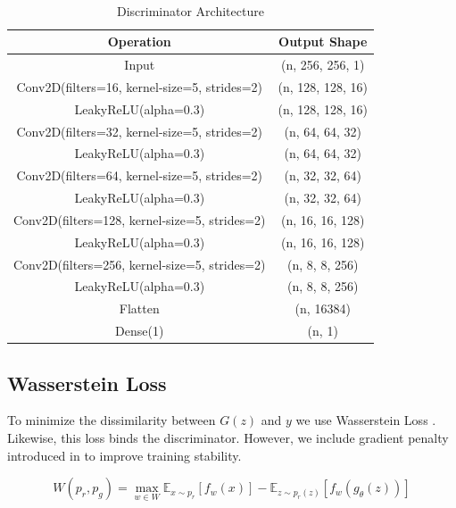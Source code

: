 \begin{center}
    \begin{table}[H]
        \centering
        \caption{\\Discriminator Architecture}
        \begin{tabular}{c|c}
             Operation & Output Shape \\
             \hline
             Input & (n, 256, 256, 1)\\
             Conv2D(filters=16, kernel-size=5, strides=2) & (n, 128, 128, 16)\\
             LeakyReLU(alpha=0.3)         & (n, 128, 128, 16)\\
             Conv2D(filters=32, kernel-size=5, strides=2) & (n, 64, 64, 32)\\
             LeakyReLU(alpha=0.3)         & (n, 64, 64, 32)\\
             Conv2D(filters=64, kernel-size=5, strides=2) & (n, 32, 32, 64)\\
             LeakyReLU(alpha=0.3)         & (n, 32, 32, 64)\\
             Conv2D(filters=128, kernel-size=5, strides=2) & (n, 16, 16, 128)\\
             LeakyReLU(alpha=0.3)         & (n, 16, 16, 128)\\
             Conv2D(filters=256, kernel-size=5, strides=2) & (n, 8, 8, 256)\\
             LeakyReLU(alpha=0.3)         & (n, 8, 8, 256)\\
             Flatten           & (n, 16384)\\
             Dense(1)             & (n, 1)\\
        \end{tabular}
        \label{tab:disc}
    \end{table}
\end{center}

\subsection{Wasserstein Loss}
\hspace{0.5in}To minimize the dissimilarity between $G(z)$ and $y$ we use Wasserstein Loss \cite{WGAN}. Likewise, this loss binds the discriminator. However, we include gradient penalty introduced in \cite{WGAN-GP} to improve training stability.

\begin{equation}
\label{eq:wasserstein}
        W(p_r, p_g) = \max_{w \in W} \mathbb{E}_{x \sim p_r}[f_w(x)] - \mathbb{E}_{z \sim p_r(z)}[f_w(g_\theta(z))]
\end{equation}

